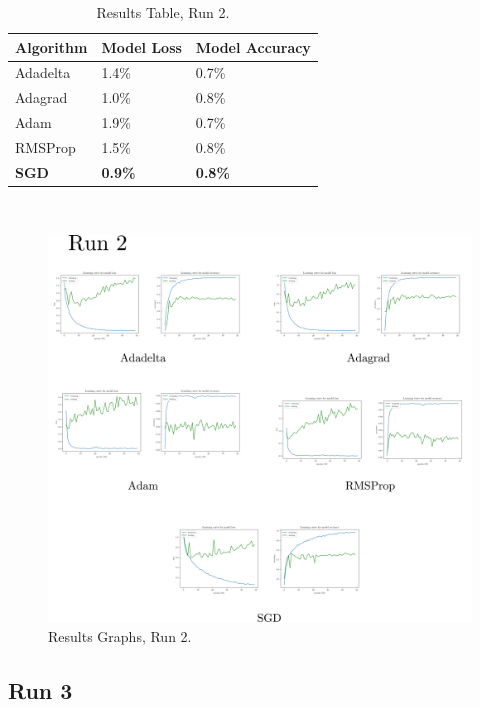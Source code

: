 \documentclass[report, 11pt, oneside]{dissertation}
\begin{document}
\begin{table}[H]
	\centering
	\begin{tabular}{|l|l|l|}
	\hline
		Algorithm    & Model Loss     & Model Accuracy \\ \hline
		Adadelta     & 1.4\%          & 0.7\%          \\ \hline
		Adagrad      & 1.0\%          & 0.8\%          \\ \hline
		Adam         & 1.9\%          & 0.7\%          \\ \hline
		RMSProp      & 1.5\%          & 0.8\%          \\ \hline
		\textbf{SGD} & \textbf{0.9\%} & \textbf{0.8\%} \\ \hline
		\end{tabular}
	\label{tab:results_2}
	\caption{Results Table, Run 2.}
\end{table}
	
\ \

\begin{figure}[H]
   \centering
	\includegraphics[scale=0.20]{figure_32.pdf}
	\caption{Results Graphs, Run 2.}
	\label{fig:results_graphs_2}
\end{figure}

\subsection{Run 3}
\end{document}
